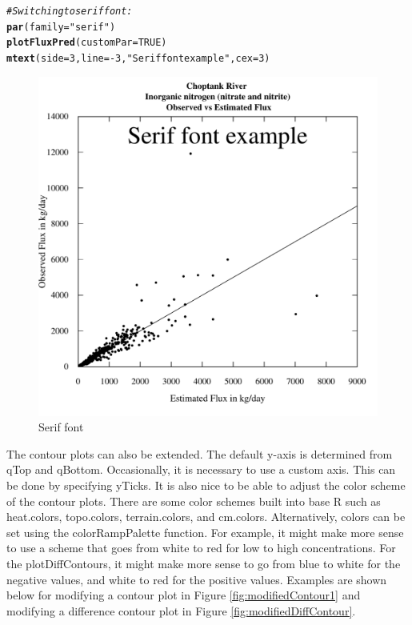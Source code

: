 \documentclass[a4paper,11pt]{article}\usepackage[]{graphicx}\usepackage[]{color}
\makeatletter
\newcommand{\hlnum}[1]{\textcolor[rgb]{0.686,0.059,0.569}{#1}}%
\newcommand{\hlstr}[1]{\textcolor[rgb]{0.192,0.494,0.8}{#1}}%
\newcommand{\hlcom}[1]{\textcolor[rgb]{0.678,0.584,0.686}{\textit{#1}}}%
\newcommand{\hlopt}[1]{\textcolor[rgb]{0,0,0}{#1}}%
\newcommand{\hlstd}[1]{\textcolor[rgb]{0.345,0.345,0.345}{#1}}%
\newcommand{\hlkwc}[1]{\textcolor[rgb]{0.333,0.667,0.333}{#1}}%
\newcommand{\hlkwd}[1]{\textcolor[rgb]{0.737,0.353,0.396}{\textbf{#1}}}%
\newenvironment{kframe}{%
 \def\at@end@of@kframe{}%
 \ifinner\ifhmode%
  \def\at@end@of@kframe{\end{minipage}}%
  \begin{minipage}{\columnwidth}%
 \fi\fi%
 \def\FrameCommand##1{\hskip\@totalleftmargin \hskip-\fboxsep
 \colorbox{shadecolor}{##1}\hskip-\fboxsep
     \hskip-\linewidth \hskip-\@totalleftmargin \hskip\columnwidth}%
 \MakeFramed {\advance\hsize-\width
   \@totalleftmargin\z@ \linewidth\hsize
   \@setminipage}}%
 {\par\unskip\endMakeFramed%
 \at@end@of@kframe}
\newenvironment{knitrout}{}{} %
\makeatother
\begin{document}
\begin{knitrout}
\color{fgcolor}\begin{kframe}
\begin{alltt}
\hlcom{# Switching to serif font:}
\hlkwd{par}\hlstd{(}\hlkwc{family}\hlstd{=}\hlstr{"serif"}\hlstd{)}
\hlkwd{plotFluxPred}\hlstd{(}\hlkwc{customPar}\hlstd{=}\hlnum{TRUE}\hlstd{)}
\hlkwd{mtext}\hlstd{(}\hlkwc{side}\hlstd{=}\hlnum{3}\hlstd{,}\hlkwc{line}\hlstd{=}\hlopt{-}\hlnum{3}\hlstd{,}\hlstr{"Serif font example"}\hlstd{,}\hlkwc{cex}\hlstd{=}\hlnum{3}\hlstd{)}
\end{alltt}
\end{kframe}\begin{figure}[]

\includegraphics[width=1\linewidth,height=1\linewidth]{figure/easyFontChange} \caption[Serif font]{Serif font\label{fig:easyFontChange}}
\end{figure}


\end{knitrout}

The contour plots can also be extended. The default y-axis is determined from qTop and qBottom. Occasionally, it is necessary to use a custom axis. This can be done by specifying yTicks. It is also nice to be able to adjust the color scheme of the contour plots. There are some color schemes built into base R such as heat.colors, topo.colors, terrain.colors, and cm.colors. Alternatively, colors can be set using the colorRampPalette function. For example, it might make more sense to use a scheme that goes from white to red for low to high concentrations. For the plotDiffContours, it might make more sense to go from blue to white for the negative values, and white to red for the positive values. Examples are shown below for modifying a contour plot in Figure \ref{fig:modifiedContour1} and modifying a difference contour plot in Figure \ref{fig:modifiedDiffContour}. 
\end{document}
